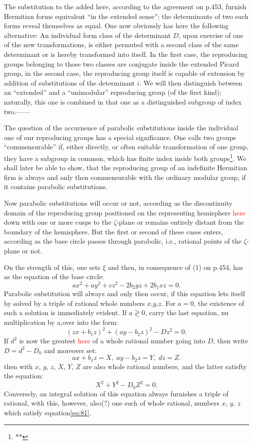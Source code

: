 The substitution to the added here, according to the agreement on p.453, furnish Hermitian forms equivalent “in the extended sense”; the determinants of two such forms reveal themselves as equal. One now obviously has here the following alternative: An individual form class of the determinant $D$, upon exercise of one of the new transformations, is either permuted with a second class of the same determinant or is hereby transformed into itself. In the first case, the reproducing groups belonging to those two classes are conjugate inside the extended Picard group, in the second case, the reproducing group itself is capable of extension by addition of substitutions of the determinant $i$. We will then distinguish between an “extended” and a “unimodular” reproducing group (of the first kind); naturally, this one is combined in that one as a distinguished subgroup of index two.——

The question of the accurnence of parabolic substitutions inside the individual one of our reproducing groups has a special significance. One calls two groups “commensurable” if, either directly, or often suitable transformation of one group, they have a subgroup in common, which has finite index inside both groups\footnote{**}.  We shall later be able to show, that the reproducing group of an indefinite Hermitian firm is always and only then commensurable with the ordinary modular group, if it contains parabolic substitutions.

Now parabolic substitutions will occur or not, according as the discontinuity domain of the reproducing group positioned on the representing hemisphere \textcolor{red}{here} down with one or more cusps to the $\zeta$-plane or remains entirely distant from the boundary of the hemisphere. But the first or second of these cases enters, according as the base circle passes through parabolic, i.e., rational points of the $\zeta$-plane or not.

On the strength of this, one sets $\xi$ and then, in consequence of (1) on p.454, has as the equation of the base circle:
\begin{equation}\label{eq:81}
ax^2+ay^2+cz^2-2b_2yz+2b_1xz=0.
\end{equation}
Parabolic substitution will always and only then occur, if this equation lets itself by solved by a triple of rational whole numbers $x$,$y$,$z$. For $a=0$, the existence of such a solution is immediately evident. If $a\gtrless0$, carry the last equation, nu multiplication by a,over into the form:
\begin{equation}
(zx+b_1z)^2+(ay-b_2z)^2-Dz^2=0.
\end{equation}
If $d^2$ is now the greatest \textcolor{red}{here} of a whole rational number going into $D$, then write $D=d^2-D_0$ and moreover set:
\[
ax+b_1z=X,\; ay-b_2z=Y,\; dz=Z.
\]
then with $x$, $y$, $z$, $X$, $Y$, $Z$ are also whole rational numbers, and the latter satisfty the equation:
\begin{equation}\label{eq:82}
X^2+Y^2-D_0Z^2=0.
\end{equation}
Conversely, an integral solution of this equation always furnishes a triple of rational, with this, however, also(?) one such of whole rational, numbers $x$, $y$, $z$ which satisfy equation\ref{eq:81}.

